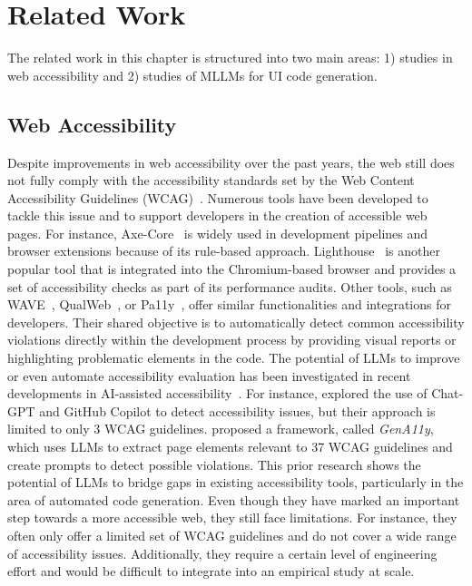 \chapter{Related Work}\label{chapter:RelatedWork}
The related work in this chapter is structured into 
two main areas: 1) studies in web accessibility and 
2) studies of MLLMs for UI code generation.


\section{Web Accessibility}
Despite improvements in web accessibility over the past years,
the web still does not fully comply with the accessibility standards 
set by the Web Content Accessibility Guidelines (WCAG)~\parencite{wcag21}.
Numerous tools have been developed to tackle this issue and to 
support developers in the creation of accessible web pages.
For instance, 
Axe-Core~\parencite{web:axecore} is widely used in development 
pipelines and browser extensions because of its rule-based approach.
Lighthouse~\parencite{web:lighthouse} is another popular tool that 
is integrated into the Chromium-based browser and provides 
a set of accessibility checks as part of its performance audits.
Other tools, such as WAVE~\parencite{web:wave}, QualWeb~\parencite{web:qualweb}, or
Pa11y~\parencite{web:pa11y}, offer similar functionalities and 
integrations for developers. 
Their shared objective is to automatically detect common accessibility violations
directly within the development process by providing visual reports 
or highlighting problematic elements in the code.\newline 
The potential of LLMs to improve or even automate accessibility evaluation 
has been investigated in recent developments in AI-assisted 
accessibility~\cite{cali2025prototype, duarte2025expanding,mowar2025codea11y}.
For instance, \textcite{lopez2025turning} explored the use of 
Chat-GPT and GitHub Copilot to detect accessibility issues, 
but their approach is limited to only 3 WCAG guidelines. 
\textcite{he2025enhancing} proposed a framework, called 
\textit{GenA11y}, which uses LLMs to extract page elements 
relevant to 37 WCAG guidelines and create prompts to 
detect possible violations. This prior research shows 
the potential of LLMs to bridge gaps in existing 
accessibility tools, particularly in the area of 
automated code generation. Even though they have 
marked an important step towards a more accessible web, they 
still face limitations. For instance, they often only offer 
a limited set of WCAG guidelines and do not cover 
a wide range of accessibility issues. Additionally, they 
require a certain level of engineering effort and would 
be difficult to integrate into an empirical study at scale.\newline



